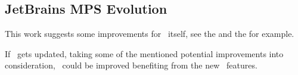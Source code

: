 \subsection{JetBrains MPS Evolution}

This work suggests some improvements for \jbmps\ itself, see the  and the 
 for example.

If \jbmps\ gets updated, taking some of the mentioned potential improvements into consideration,
 \pcpp\ could be improved benefiting from the new \jbmps\ features.